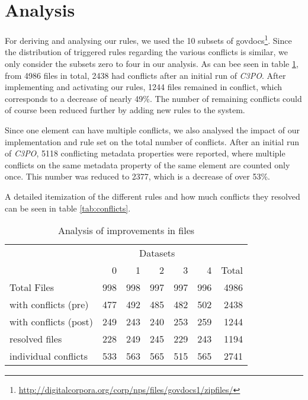 \documentclass[a4paper,12pt]{article}
\begin{document}
\section{Analysis}

For deriving and analysing our rules, we used the 10 subsets of govdocs\footnote{\url{http://digitalcorpora.org/corp/nps/files/govdocs1/zipfiles/}}.
Since the distribution of triggered rules regarding the various conflicts is similar, we only consider the subsets zero to four in our analysis.
As can bee seen in table \ref{tab:files}, from 4986 files in total, 2438 had conflicts after an initial run of \emph{C3PO}. After implementing and activating our rules, 1244 files remained in conflict, which corresponds to a decrease of nearly 49\%. The number of remaining conflicts could of course been reduced further by adding new rules to the system.

Since one element can have multiple conflicts, we also analysed the impact of our implementation and rule set on the total number of conflicts.
After an initial run of \emph{C3PO}, 5118 conflicting metadata properties were reported, where multiple conflicts on the same metadata property of the same element are counted only once. This number was reduced to 2377, which is a decrease of over 53\%.

A detailed itemization of the different rules and how much conflicts they resolved can be seen in table \ref{tab:conflicts}.

\begin{table}[ht]
\begin{center}

\begin{tabular}[h]{l||r|r|r|r|r||r}
 &  \multicolumn{5}{c}{Datasets} \\
        & 0 & 1 & 2 & 3 & 4 & Total \\
\hline
Total Files & 998 & 998 & 997 & 997 & 996 & 4986\\ 
\hline
with conflicts (pre) & 477 &	492 & 485 & 482	& 502 &	2438\\ 
with conflicts (post) & 249	& 243 &	240 & 253 &	259 & 1244\\
\hline
resolved files & 228 & 249 & 245 & 229 & 243 & 1194 \\
individual conflicts & 533 & 563 & 565 & 515 & 565 & 2741 \\


\end{tabular}
\end{center}
\caption{Analysis of improvements in files}
\label{tab:files}
\end{table}
\end{document}
